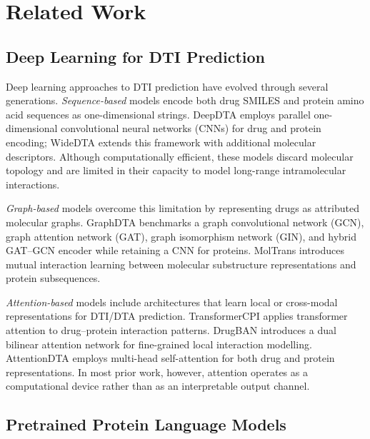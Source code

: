 \documentclass[fleqn,10pt]{wlscirep}
\begin{document}
\section{Related Work}
\label{sec:related}

\subsection{Deep Learning for DTI Prediction}

Deep learning approaches to DTI prediction have evolved through several
generations.\cite{wen2017deep}  \emph{Sequence-based} models encode both
drug SMILES and protein amino acid sequences as one-dimensional strings.
DeepDTA\cite{ozturk2018deepdta} employs parallel one-dimensional convolutional
neural networks (CNNs) for drug and
protein encoding; WideDTA\cite{ozturk2019widedta} extends this framework
with additional molecular descriptors.  Although computationally efficient, these
models discard molecular topology and are limited in their capacity to model
long-range intramolecular interactions.

\emph{Graph-based} models overcome this limitation by representing drugs as
attributed molecular graphs.  GraphDTA\cite{nguyen2021graphdta} benchmarks a
graph convolutional network (GCN), graph attention network (GAT), graph
isomorphism network (GIN), and hybrid GAT--GCN encoder while retaining a CNN
for proteins.  MolTrans\cite{huang2021moltrans} introduces mutual
interaction learning between molecular substructure representations and protein
subsequences.

\begingroup\color{red}
\emph{Attention-based} models include architectures that learn local or
cross-modal representations for DTI/DTA prediction.
\endgroup
TransformerCPI\cite{chen2020transformercpi} applies transformer attention to
drug--protein interaction patterns.  DrugBAN\cite{bai2023drugban} introduces
a dual bilinear attention network for fine-grained local interaction modelling.
AttentionDTA\cite{zhao2022attentiondta} employs multi-head self-attention for
both drug and protein representations.  In most prior work, however, attention
operates as a computational device rather than as an interpretable output channel.

\subsection{Pretrained Protein Language Models}
\end{document}
